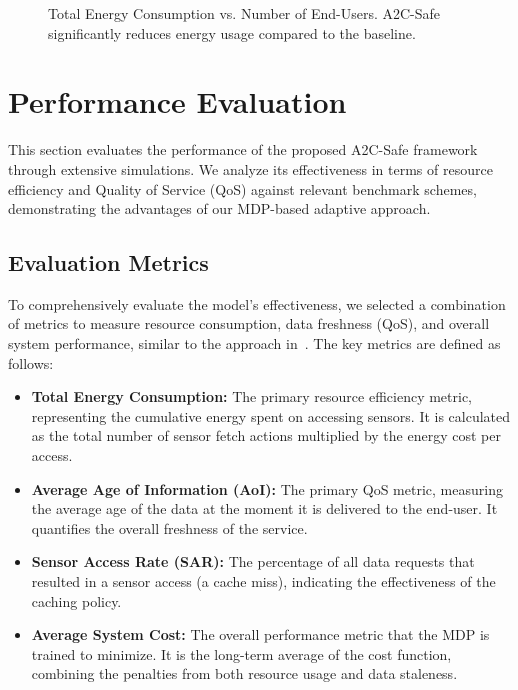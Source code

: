\documentclass[journal]{IEEEtran}
\begin{document}
\begin{figure}[!t]
    \centering
    \caption{Total Energy Consumption vs. Number of End-Users. A2C-Safe significantly reduces energy usage compared to the baseline.}
    \label{fig:results_energy}
\end{figure}

\section{Performance Evaluation}
This section evaluates the performance of the proposed A2C-Safe framework through extensive simulations. We analyze its effectiveness in terms of resource efficiency and Quality of Service (QoS) against relevant benchmark schemes, demonstrating the advantages of our MDP-based adaptive approach.

\subsection{Evaluation Metrics}
To comprehensively evaluate the model's effectiveness, we selected a combination of metrics to measure resource consumption, data freshness (QoS), and overall system performance, similar to the approach in~\cite{cite: 664}. The key metrics are defined as follows:

\begin{itemize}
    \item \textbf{Total Energy Consumption:} The primary resource efficiency metric, representing the cumulative energy spent on accessing sensors. It is calculated as the total number of sensor fetch actions multiplied by the energy cost per access.
    \item \textbf{Average Age of Information (AoI):} The primary QoS metric, measuring the average age of the data at the moment it is delivered to the end-user. It quantifies the overall freshness of the service.
    \item \textbf{Sensor Access Rate (SAR):} The percentage of all data requests that resulted in a sensor access (a cache miss), indicating the effectiveness of the caching policy.
    \item \textbf{Average System Cost:} The overall performance metric that the MDP is trained to minimize. It is the long-term average of the cost function, combining the penalties from both resource usage and data staleness.
\end{itemize}
\end{document}

